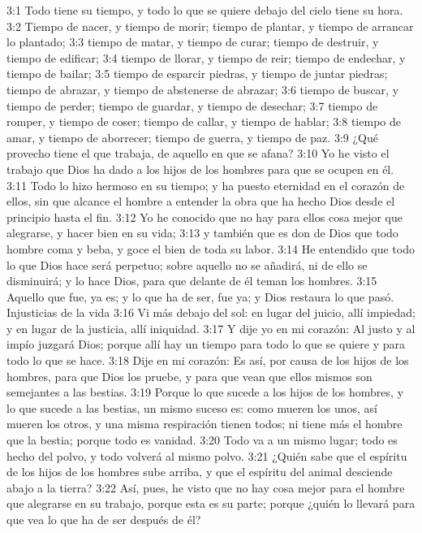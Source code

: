 3:1 Todo tiene su tiempo, y todo lo que se quiere debajo del cielo tiene su hora.  
3:2 Tiempo de nacer, y tiempo de morir; tiempo de plantar, y tiempo de arrancar lo plantado;  
3:3 tiempo de matar, y tiempo de curar; tiempo de destruir, y tiempo de edificar;  
3:4 tiempo de llorar, y tiempo de reir; tiempo de endechar, y tiempo de bailar;  
3:5 tiempo de esparcir piedras, y tiempo de juntar piedras; tiempo de abrazar, y tiempo de abstenerse de abrazar;  
3:6 tiempo de buscar, y tiempo de perder; tiempo de guardar, y tiempo de desechar;  
3:7 tiempo de romper, y tiempo de coser; tiempo de callar, y tiempo de hablar;  
3:8 tiempo de amar, y tiempo de aborrecer; tiempo de guerra, y tiempo de paz.  
3:9 ¿Qué provecho tiene el que trabaja, de aquello en que se afana?  
3:10 Yo he visto el trabajo que Dios ha dado a los hijos de los hombres para que se ocupen en él.  
3:11 Todo lo hizo hermoso en su tiempo; y ha puesto eternidad en el corazón de ellos, sin que alcance el hombre a entender la obra que ha hecho Dios desde el principio hasta el fin.  
3:12 Yo he conocido que no hay para ellos cosa mejor que alegrarse, y hacer bien en su vida;  
3:13 y también que es don de Dios que todo hombre coma y beba, y goce el bien de toda su labor.  
3:14 He entendido que todo lo que Dios hace será perpetuo; sobre aquello no se añadirá, ni de ello se disminuirá; y lo hace Dios, para que delante de él teman los hombres.  
3:15 Aquello que fue, ya es; y lo que ha de ser, fue ya; y Dios restaura lo que pasó.  
Injusticias de la vida  
3:16 Vi más debajo del sol: en lugar del juicio, allí impiedad; y en lugar de la justicia, allí iniquidad.  
3:17 Y dije yo en mi corazón: Al justo y al impío juzgará Dios; porque allí hay un tiempo para todo lo que se quiere y para todo lo que se hace.  
3:18 Dije en mi corazón: Es así, por causa de los hijos de los hombres, para que Dios los pruebe, y para que vean que ellos mismos son semejantes a las bestias.  
3:19 Porque lo que sucede a los hijos de los hombres, y lo que sucede a las bestias, un mismo suceso es: como mueren los unos, así mueren los otros, y una misma respiración tienen todos; ni tiene más el hombre que la bestia; porque todo es vanidad.  
3:20 Todo va a un mismo lugar; todo es hecho del polvo, y todo volverá al mismo polvo.  
3:21 ¿Quién sabe que el espíritu de los hijos de los hombres sube arriba, y que el espíritu del animal desciende abajo a la tierra?  
3:22 Así, pues, he visto que no hay cosa mejor para el hombre que alegrarse en su trabajo, porque esta es su parte; porque ¿quién lo llevará para que vea lo que ha de ser después de él?  

